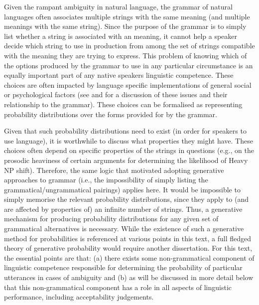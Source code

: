 Given the rampant ambiguity in natural language, the grammar of natural languages often associates multiple strings with the same meaning (and multiple meanings with the same string). Since the purpose of the grammar is to simply list whether a string is associated with an meaning, it cannot help a speaker decide which string to use in production from among the set of strings compatible with the meaning they are trying to express. This problem of knowing which of the options produced by the grammar to use in any particular circumstance is an equally important part of any native speakers linguistic competence. These choices are often impacted by language specific implementations of general social or psychological factors (see \cite{Bresnan.2007,Bresnan.2010,Zeevat.2014} and \cite{Tamminga.2016} for a discussion of these issues and their relationship to the grammar). These choices can be formalised as representing probability distributions over the forms provided for by the grammar.

Given that such probability distributions need to exist (in order for speakers to use language), it is worthwhile to discuss what properties they might have. These choices often depend on specific properties of the strings in questions (e.g., on the prosodic heaviness of certain arguments for determining the likelihood of Heavy NP shift). Therefore, the same logic that motivated adopting generative approaches to grammar (i.e., the impossibility of simply listing the grammatical/ungrammatical pairings) applies here. It would be impossible to simply memorise the relevant probability distributions, since they apply to (and are affected by properties of) an infinite number of strings. Thus, a generative mechanism for producing probability distributions for any given set of grammatical alternatives is necessary. While the existence of such a generative method for probabilities is referenced at various points in this text, a full fledged theory of generative probability would require another dissertation. For this text, the essential points are that: (a) there exists some non-grammatical component of linguistic competence responsible for determining the probability of particular utterances in cases of ambiguity and (b) as will be discussed in more detail below that this non-grammatical component has a role in all aspects of linguistic performance, including acceptability judgements.

